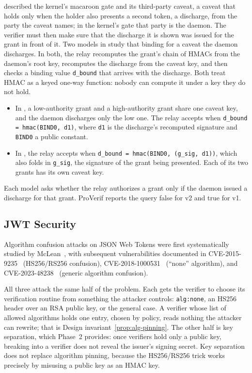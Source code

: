 \documentclass[11pt,a4paper]{article}
\theoremstyle{definition}
\begin{document}
 described the kernel's macaroon gate
and its third-party caveat, a caveat that holds only when the holder also
presents a second token, a discharge, from the party the caveat names; in the
kernel's gate that party is the daemon. The verifier must then
make sure that the discharge it is shown was issued for the grant in front of
it. Two models in  study that binding for a caveat the daemon
discharges. In both, the relay recomputes the grant's chain of HMACs from the
daemon's root key, recomputes the discharge from the caveat key, and then
checks a binding value \texttt{d\_bound} that arrives with the discharge. Both
treat HMAC as a keyed one-way function: nobody can compute it under a key they
do not hold.
\begin{itemize}
  \item In , a
  low-authority grant and a high-authority grant share one caveat key, and the
  daemon discharges only the low one. The relay accepts when
  \texttt{d\_bound = hmac(BIND0, d1)}, where \texttt{d1} is the discharge's
  recomputed signature and \texttt{BIND0} a public constant.
  \item In , the relay accepts when
  \texttt{d\_bound = hmac(BIND0, (g\_sig, d1))}, which also folds in
  \texttt{g\_sig}, the signature of the grant being presented. Each of its
  two grants has its own caveat key.
\end{itemize}
Each model asks whether the relay authorizes a grant only if the daemon issued
a discharge for that grant. ProVerif reports the query false for v2 and true
for v1.

\subsection{JWT Security}

Algorithm confusion attacks on JSON Web Tokens were first systematically studied by McLean~, with subsequent vulnerabilities documented in CVE-2015-9235~ (HS256/RS256 confusion), CVE-2018-1000531~ (``none'' algorithm), and CVE-2023-48238~ (generic algorithm confusion).

All three attack the same half of the problem. Each gets the verifier to choose its verification routine from something the attacker controls: \texttt{alg:none}, an HS256 header over an RSA public key, or the general case. A verifier whose list of allowed algorithms holds one entry, chosen by policy, reads nothing the attacker can rewrite; that is Design invariant~\ref{prop:alg-pinning}. The other half is key separation, which Phase~2 provides: once verifiers hold only a public key, breaking into a verifier does not reveal the issuer's signing secret. Key separation does not replace algorithm pinning, because the HS256/RS256 trick works precisely by misusing a public key as an HMAC key.
\end{document}
